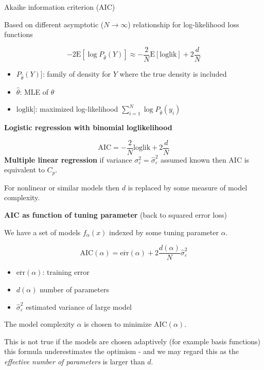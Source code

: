 \documentclass[
  ignorenonframetext,
]{beamer}
\providecommand{\tightlist}{%
  \setlength{\itemsep}{0pt}\setlength{\parskip}{0pt}}
\begin{document}
\begin{frame}

\begin{block}{Akaike information criterion (AIC)}

Based on different asymptotic (\(N \rightarrow \infty\)) relationship
for log-likelihood loss functions

\[ -2 \text{E}[\log P_{\hat{\theta}}(Y)]\approx - \frac{2}{N} \text{E}[\text{loglik}]+2 \frac{d}{N} \]

\begin{itemize}
\tightlist
\item
  \(P_{\hat{\theta}}(Y)]\): family of density for \(Y\) where the true
  density is included
\item
  \(\hat{\theta}\): MLE of \(\theta\)
\item
  \(\text{loglik}]\): maximized log-likelihood
  \(\sum_{i=1}^N \log P_{\hat{\theta}}(y_i)\)
\end{itemize}

\end{block}

\end{frame}

\begin{frame}

\textbf{Logistic regression with binomial loglikelihood}

\[ \text{AIC}=- \frac{2}{N} \text{loglik}+2 \frac{d}{N}\]
\textbf{Multiple linear regression} if variance
\(\sigma_{\varepsilon}^2=\hat{\sigma}_{\varepsilon}^2\) assumed known
then AIC is equivalent to \(C_p\).

For nonlinear or similar models then \(d\) is replaced by some measure
of model complexity.

\end{frame}

\begin{frame}

\textbf{AIC as function of tuning parameter} (back to squared error
loss)

We have a set of models \(f_{\alpha}(x)\) indexed by some tuning
parameter \(\alpha\).

\[\text{AIC}(\alpha)=\overline{\text{err}}(\alpha)+2 \frac{d(\alpha)}{N}\hat{\sigma}_{\varepsilon}^2\]

\begin{itemize}
\tightlist
\item
  \(\overline{\text{err}}(\alpha)\): training error
\item
  \(d(\alpha)\) number of parameters
\item
  \(\hat{\sigma}_{\varepsilon}^2\) estimated variance of large model
\end{itemize}

The model complexity \(\alpha\) is chosen to minimize
\(\text{AIC}(\alpha)\).

This is not true if the models are chosen adaptively (for example basis
functions) this formula underestimates the optimism - and we may regard
this as the \emph{effective number of parameters} is larger than \(d\).

\end{frame}
\end{document}
